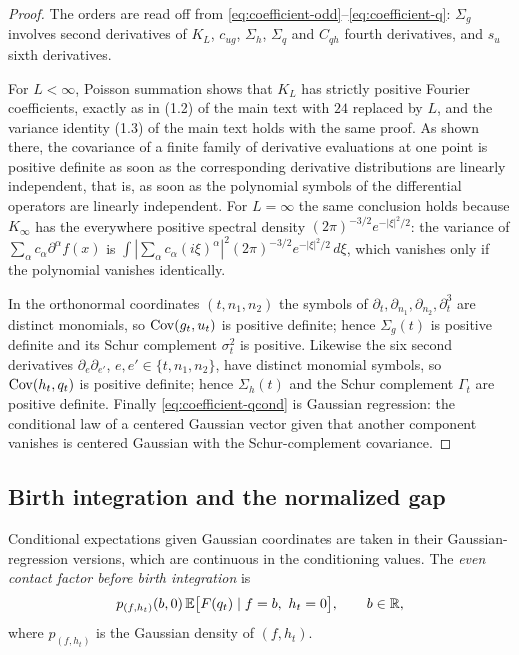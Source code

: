 \begin{proof}
The orders are read off from \eqref{eq:coefficient-odd}--\eqref{eq:coefficient-q}: $\Sigma_g$ involves second derivatives of $K_L$, $c_{ug}$, $\Sigma_h$, $\Sigma_q$ and $C_{qh}$ fourth derivatives, and $s_u$ sixth derivatives.

For $L<\infty$, Poisson summation shows that $K_L$ has strictly positive Fourier coefficients, exactly as in (1.2) of the main text with $24$ replaced by $L$, and the variance identity (1.3) of the main text holds with the same proof. As shown there, the covariance of a finite family of derivative evaluations at one point is positive definite as soon as the corresponding derivative distributions are linearly independent, that is, as soon as the polynomial symbols of the differential operators are linearly independent. For $L=\infty$ the same conclusion holds because $K_\infty$ has the everywhere positive spectral density $(2\pi)^{-3/2}e^{-|\xi|^2/2}$: the variance of $\sum_\alpha c_\alpha\partial^\alpha f(x)$ is $\int|\sum_\alpha c_\alpha(i\xi)^\alpha|^2(2\pi)^{-3/2}e^{-|\xi|^2/2}\,d\xi$, which vanishes only if the polynomial vanishes identically.

In the orthonormal coordinates $(t,n_1,n_2)$ the symbols of $\partial_t,\partial_{n_1},\partial_{n_2},\partial_t^3$ are distinct monomials, so $\operatorname{Cov}(g_t,u_t)$ is positive definite; hence $\Sigma_g(t)$ is positive definite and its Schur complement $\sigma_t^2$ is positive. Likewise the six second derivatives $\partial_e\partial_{e'}$, $e,e'\in\{t,n_1,n_2\}$, have distinct monomial symbols, so $\operatorname{Cov}(h_t,q_t)$ is positive definite; hence $\Sigma_h(t)$ and the Schur complement $\Gamma_t$ are positive definite. Finally \eqref{eq:coefficient-qcond} is Gaussian regression: the conditional law of a centered Gaussian vector given that another component vanishes is centered Gaussian with the Schur-complement covariance.
\end{proof}

\subsection{Birth integration and the normalized gap}\label{ssec:coefficient-birth}

Conditional expectations given Gaussian coordinates are taken in their Gaussian-regression versions, which are continuous in the conditioning values. The \emph{even contact factor before birth integration} is
\begin{equation}\label{eq:coefficient-even-factor}
p_{(f,h_t)}(b,0)\,\mathbb E\bigl[F(q_t)\mid f=b,\ h_t=0\bigr],\qquad b\in\mathbb R ,
\end{equation}
where $p_{(f,h_t)}$ is the Gaussian density of $(f,h_t)$.

